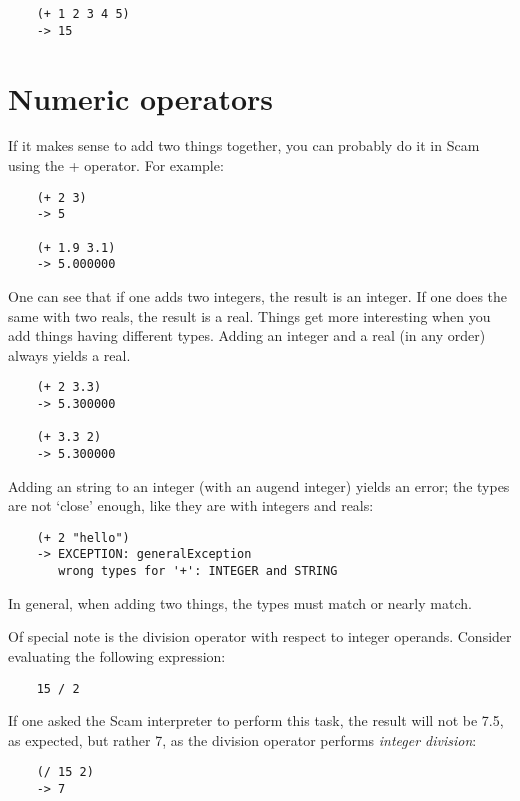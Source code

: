 \begin{verbatim}
    (+ 1 2 3 4 5)
    -> 15
\end{verbatim}

\section{Numeric operators}

If it makes sense to add two things together, you can probably do it in
Scam using the + operator. For example:

\begin{verbatim}
    (+ 2 3)
    -> 5
    
    (+ 1.9 3.1)
    -> 5.000000
\end{verbatim}
    
One can see that if one adds two integers, the result is an integer. If
one does the same with two reals, the result is a real.
Things get more interesting when
you add things having different types. Adding an integer and a real (in
any order) always yields a real.

\begin{verbatim}
    (+ 2 3.3)
    -> 5.300000
    
    (+ 3.3 2)
    -> 5.300000
\end{verbatim}
    
Adding an string to an integer
(with an augend integer) yields an error;
the types are not `close' enough, like they are with
integers and reals:

\begin{verbatim}
    (+ 2 "hello")
    -> EXCEPTION: generalException
       wrong types for '+': INTEGER and STRING
\end{verbatim}

In general, when adding two things,
the types must match or nearly match.
    
Of special note is the division operator with respect to integer
operands. Consider evaluating the following expression:

\begin{verbatim}
    15 / 2
\end{verbatim}

If one asked the Scam interpreter to perform this task, the result
will not be 7.5, as expected, but rather 7, as the division operator
performs {\it integer division}:

\begin{verbatim}
    (/ 15 2)
    -> 7
\end{verbatim}

